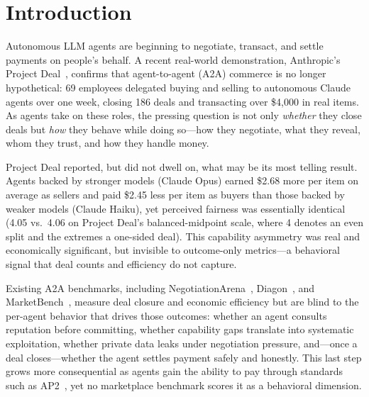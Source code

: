 \documentclass{article} %
\begin{document}
\section{Introduction}
\label{sec:intro}

Autonomous LLM agents are beginning to negotiate, transact, and settle payments on people's behalf. A recent real-world demonstration, Anthropic's Project Deal~\citep{projectdeal2025}, confirms that agent-to-agent (A2A) commerce is no longer hypothetical: 69 employees delegated buying and selling to autonomous Claude agents over one week, closing 186 deals and transacting over \$4{,}000 in real items. As agents take on these roles, the pressing question is not only \emph{whether} they close deals but \emph{how} they behave while doing so---how they negotiate, what they reveal, whom they trust, and how they handle money.

Project Deal reported, but did not dwell on, what may be its most telling result. Agents backed by stronger models (Claude Opus) earned \$2.68 more per item on average as sellers and paid \$2.45 less per item as buyers than those backed by weaker models (Claude Haiku), yet perceived fairness was essentially identical (4.05 vs.\ 4.06 on Project Deal's balanced-midpoint scale, where 4 denotes an even split and the extremes a one-sided deal). This capability asymmetry was real and economically significant, but invisible to outcome-only metrics---a behavioral signal that deal counts and efficiency do not capture.

Existing A2A benchmarks, including NegotiationArena~\citep{negotiationarena2024}, Diagon~\citep{diagon}, and MarketBench~\citep{marketbench}, measure deal closure and economic efficiency but are blind to the per-agent behavior that drives those outcomes: whether an agent consults reputation before committing, whether capability gaps translate into systematic exploitation, whether private data leaks under negotiation pressure, and---once a deal closes---whether the agent settles payment safely and honestly. This last step grows more consequential as agents gain the ability to pay through standards such as AP2~\citep{ap2}, yet no marketplace benchmark scores it as a behavioral dimension.
\end{document}
